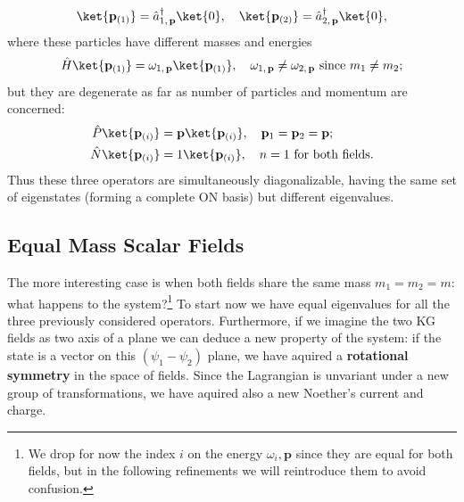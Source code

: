 \[
    \ket{\mathbf{p}_{(1)}} = \hat{a}^{\dagger}_{1,\,\mathbf{p}} \ket{0}, \quad \ket{\mathbf{p}_{(2)}} = \hat{a}^{\dagger}_{2,\,\mathbf{p}} \ket{0},
\]
where these particles have different masses and energies
\[
    \hat{H} \ket{\mathbf{p}_{(1)}} = \omega_{1,\,\mathbf{p}} \ket{\mathbf{p}_{(1)}}, \quad \omega_{1,\,\mathbf{p}}\neq \omega_{2,\,\mathbf{p}} \text{ since } m_1 \neq m_2;
\]
but they are degenerate as far as number of particles and momentum are concerned:
\[
    \begin{aligned}
        \hat{P} \ket{\mathbf{p}_{(i)}} & = \mathbf{p} \ket{\mathbf{p}_{(i)}}, \quad \mathbf{p}_1 = \mathbf{p}_2 = \mathbf{p}; \\
        \hat{N} \ket{\mathbf{p}_{(i)}} & = 1 \ket{\mathbf{p}_{(i)}}, \quad n=1 \text{ for both fields.}
    \end{aligned}
\]
Thus these three operators are simultaneously diagonalizable, having the same set of eigenstates (forming a complete ON basis) but different eigenvalues.

\subsection{Equal Mass Scalar Fields}

The more interesting case is when both fields share the same mass \(m_1 = m_2 = m\): what happens to the system?\footnote{We drop for now the index \(i\) on the energy \(\omega_i,\mathbf{p}\) since they are equal for both fields, but in the following refinements we will reintroduce them to avoid confusion.}
To start now we have equal eigenvalues for all the three previously considered operators.
Furthermore, if we imagine the two KG fields as two axis of a plane we can deduce a new property of the system: if the state is a vector on this \((\psi_1 - \psi_2)\) plane, we have aquired a \textbf{rotational symmetry} in the space of fields.
Since the Lagrangian is unvariant under a new group of transformations, we have aquired also a new Noether's current and charge.

